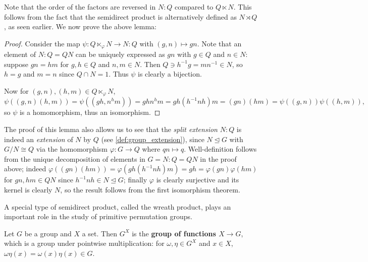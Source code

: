 Note that the order of the factors are reversed in $N : Q$ compared to $Q \ltimes N$. This follows from the fact that the semidirect product is alternatively defined as $N \rtimes Q$, as seen earlier. We now prove the above lemma:

\begin{proof}
    Consider the map $\psi : Q \ltimes_\varphi N \to N : Q$ with $(g,n) \mapsto gn$. Note that an element of $N : Q = QN$ can be uniquely expressed as $gn$ with $g \in Q$ and $n \in N$: suppose $gn = hm$ for $g,h \in Q$ and $n,m \in N$. Then $Q \ni h^{-1}g = mn^{-1} \in N$, so $h = g$ and $m = n$ since $Q \cap N = 1$. Thus $\psi$ is clearly a bijection.

    Now for $(g,n),(h,m) \in Q \ltimes_\varphi N$,
    $$\psi((g,n)(h,m)) = \psi((gh,n^hm)) = ghn^hm = gh(h^{-1}nh)m = (gn)(hm) = \psi((g,n))\psi((h,m)),$$
    so $\psi$ is a homomorphism, thus an isomorphism.
\end{proof}

The proof of this lemma also allows us to see that the \textit{split extension} $N : Q$ is indeed an \textit{extension} of $N$ by $Q$ (see \autoref{def:group_extension}), since $N \unlhd G$ with $G/N \cong Q$ via the homomorphism $\varphi : G \to Q$ where $qn \mapsto q$. Well-definition follows from the unique decomposition of elements in $G = N : Q = QN$ in the proof above; indeed $\varphi((gn)(hm)) = \varphi(gh(h^{-1}nh)m) = gh = \varphi(gn)\varphi(hm)$ for $gn,hm \in QN$ since $h^{-1}nh \in N \unlhd G$; finally $\varphi$ is clearly surjective and its kernel is clearly $N$, so the result follows from the first isomorphism theorem.


A special type of semidirect product, called the wreath product, plays an important role in the study of primitive  permutation groups.

\begin{definition}\label{def:function_group}
    Let $G$ be a group and $X$ a set. Then $G^X$ is the \textbf{group of functions $X \to G$}, which is a group under pointwise multiplication: for $\omega,\eta \in G^X$ and $x \in X$, $\omega\eta(x) = \omega(x)\eta(x) \in G$.
\end{definition}


